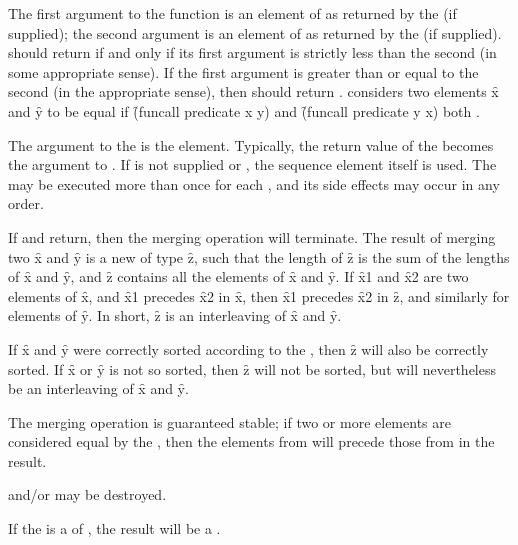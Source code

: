 The first argument to the  function is an element of
 as returned by the  (if supplied); 
the second argument is an element of  as returned by 
the  (if supplied). 
 should return  if and only if its first 
argument is strictly less than the second (in some appropriate sense). 
If the first argument is greater than or equal to the second
(in the appropriate sense), then  should return .
considers two elements \f{x} and \f{y} to be equal if
\f{(funcall predicate x y)} and
\f{(funcall predicate y x)} both  .

The argument to the  is the  element.
Typically, the return value of the  
becomes the argument to .
If  is not supplied or \nil, the sequence element itself is used.
The  may be executed more than once for each  ,
and its side effects may occur in any order.

If  and  return, then the merging operation 
will terminate.  The result of merging two  \f{x} and \f{y}
is a new  of type  \f{z}, 
such that the length of \f{z} is the sum of the lengths of \f{x}
and \f{y}, and \f{z} contains all the elements of \f{x} and \f{y}.
If \f{x1} and \f{x2} are two elements of \f{x}, and \f{x1} precedes
\f{x2} in \f{x}, then \f{x1} precedes \f{x2} in \f{z}, and similarly for
elements of \f{y}.  In short, \f{z} is an interleaving of \f{x} and \f{y}.

If \f{x} and \f{y} were correctly sorted according to the
, then \f{z} will also be correctly sorted.
If \f{x} or \f{y} is not so sorted, then \f{z} will not be sorted,
but will nevertheless be an interleaving of \f{x} and \f{y}.

The merging operation is guaranteed stable;
if two or more elements are considered equal by the , 
then the elements from  will
precede those from  in the result.

 and/or  may be destroyed.

If the  is a  of ,
the result will be a .

